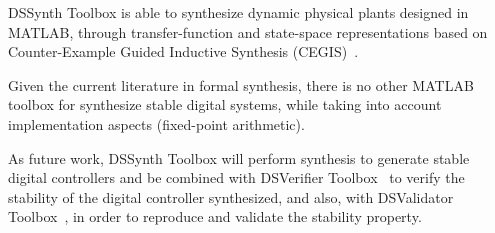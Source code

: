 \documentclass[sigconf]{acmart}
\newcommand\tool{{DSSynth Toolbox}\xspace}
\begin{document}
\tool is able to synthesize dynamic physical plants designed in MATLAB, through transfer-function and state-space representations based on Counter-Example Guided Inductive Synthesis (CEGIS)~\cite{DBLP:conf/asplos/Solar-LezamaTBSS06}.

Given the current literature in formal synthesis, there is no other MATLAB toolbox for synthesize stable digital systems, while taking into account implementation aspects (fixed-point arithmetic). 

As future work, \tool will perform synthesis to generate stable digital controllers and be combined with DSVerifier Toolbox~\cite{issta2017} to verify the stability of the digital controller synthesized, and also, with DSValidator Toolbox~\cite{dsvalidator}, in order to reproduce and validate the stability property.  



 
\end{document}
